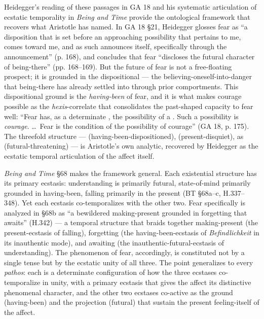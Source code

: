 Heidegger's reading of these passages in GA 18 and his systematic articulation of ecstatic temporality in \textit{Being and Time} provide the ontological framework that recovers what Aristotle has named. In GA 18 \S21, Heidegger glosses fear as ``a disposition that is set before an approaching possibility that pertains to me, comes toward me, and as such announces itself, specifically through the announcement'' (p. 168), and concludes that fear ``discloses the futural character of being-there'' (pp. 168--169). But the future of fear is not a free-floating prospect; it is grounded in the dispositional  --- the believing-oneself-into-danger that being-there has already settled into through prior comportments. This dispositional ground is the \textit{having-been} of fear, and it is what makes courage possible as the \textit{hexis}-correlate that consolidates the past-shaped capacity to fear well: ``Fear has, as a determinate , the possibility of a . Such a possibility is \textit{courage}. \ldots\ Fear is the condition of the possibility of courage'' (GA 18, p. 175). The threefold structure ---  (having-been-dispositioned),  (present-disquiet),  as  (futural-threatening) --- is Aristotle's own analytic, recovered by Heidegger as the ecstatic temporal articulation of the affect itself.

\textit{Being and Time} \S68 makes the framework general. Each existential structure has its primary ecstasis: understanding is primarily futural, state-of-mind primarily grounded in having-been, falling primarily in the present (BT \S68a--c, H.337--348). Yet each ecstasis co-temporalizes with the other two. Fear specifically is analyzed in \S68b as ``a bewildered making-present grounded in forgetting that awaits'' (H.342) --- a temporal structure that braids together making-present (the present-ecstasis of falling), forgetting (the having-been-ecstasis of \textit{Befindlichkeit} in its inauthentic mode), and awaiting (the inauthentic-futural-ecstasis of understanding). The phenomenon of fear, accordingly, is constituted not by a single tense but by the ecstatic unity of all three. The point generalizes to every \textit{pathos}: each is a determinate configuration of how the three ecstases co-temporalize in unity, with a primary ecstasis that gives the affect its distinctive phenomenal character, and the other two ecstases co-active as the ground (having-been) and the projection (futural) that sustain the present feeling-itself of the affect.

